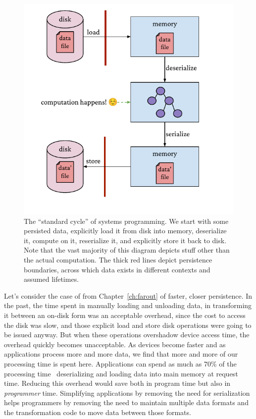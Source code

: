 \begin{figure}
    \centering
    \includegraphics[width=\linewidth]{fig/cycle.pdf}
    \caption{The ``standard cycle'' of systems programming. We start with some persisted data, explicitly load it from disk into memory, deserialize it, compute on it, reserialize it, and explicitly store it back to disk. Note that the vast majority of this diagram depicts stuff other than the actual computation. The thick red lines depict persistence boundaries, across which data exists in different contexts and assumed lifetimes.}
    \label{fig:cycle}
\end{figure}

Let's consider the case of from Chapter~\ref{ch:farout} of faster, closer persistence.
In the past, the time spent in manually loading and unloading
data, in transforming it between an on-disk form was an acceptable overhead, since the cost to access the disk was slow,
and those explicit load and store disk operations were going to be issued anyway. But when these operations overshadow
device access time, the overhead quickly becomes unacceptable. As devices become faster and as applications process more
and more data, we find that more and more of our processing time is spent here. Applications can spend as much as 70\% of the processing
time~\cite{trims} deserializing and loading data into main memory at request time. Reducing this overhead would save
both in program time but also in \emph{programmer} time. Simplifying applications by removing the need for serialization
helps programmers by removing the need to maintain multiple data formats and the transformation code to move data
between those formats.

